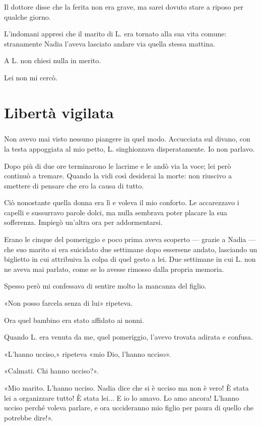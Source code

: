 \documentclass[a4paper,12pt]{book}
\begin{document}
Il dottore disse che la ferita non era grave, ma sarei dovuto stare a riposo per
qualche giorno.

L'indomani appresi che il marito di L. era tornato alla sua vita comune:
stranamente Nadia l'aveva lasciato andare via quella stessa mattina.

A L. non chiesi nulla in merito.

Lei non mi cercò.

\chapter{Libertà vigilata}

\paragraph{}
Non avevo mai visto nessuno piangere in quel modo. Accucciata sul divano, con la
testa appoggiata al mio petto, L. singhiozzava disperatamente. Io non parlavo.

Dopo più di due ore terminarono le lacrime e le andò via la voce; lei però
continuò a tremare. Quando la vidi così desiderai la morte: non riuscivo a
smettere di pensare che ero la causa di tutto.

Ciò nonostante quella donna era lì e voleva il mio conforto. Le accarezzavo i
capelli e sussurravo parole dolci, ma nulla sembrava poter placare la sua
sofferenza. Impiegò un'altra ora per addormentarsi.

Erano le cinque del pomeriggio e poco prima aveva scoperto --- grazie a Nadia
--- che suo marito si era suicidato due settimane dopo essersene andato,
lasciando un biglietto in cui attribuiva la colpa di quel gesto a lei. Due
settimane in cui L. non ne aveva mai parlato, come se lo avesse rimosso dalla
propria memoria.

Spesso però mi confessava di sentire molto la mancanza del figlio.

«Non posso farcela senza di lui» ripeteva.

Ora quel bambino era stato affidato ai nonni.

Quando L. era venuta da me, quel pomeriggio, l'avevo trovata adirata e confusa.

«L'hanno ucciso,» ripeteva «mio Dio, l'hanno ucciso».

«Calmati. Chi hanno ucciso?».

«Mio marito. L'hanno ucciso. Nadia dice che si è ucciso ma non è vero! È stata
lei a organizzare tutto! È stata lei... E io lo amavo. Lo amo ancora! L'hanno
ucciso perché voleva parlare, e ora uccideranno mio figlio per paura di quello
che potrebbe dire!».
\end{document}
